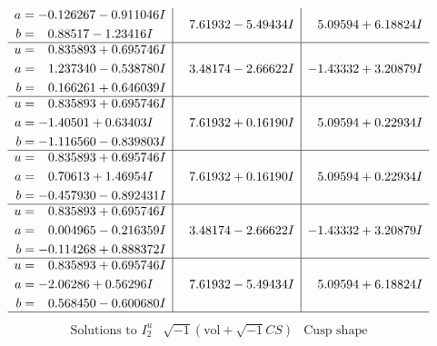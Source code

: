 \documentclass[1p]{elsarticle_modified}
\theoremstyle{definition}
\newcommand{\I}{\sqrt{-1}}
\begin{document}
$$\begin{array}{c|c|c}
\begin{aligned}
a &= -0.126267 - 0.911046 I \\
b &= \phantom{-}0.88517 - 1.23416 I\end{aligned}
 & \phantom{-}7.61932 - 5.49434 I & \phantom{-}5.09594 + 6.18824 I \\ \hline\begin{aligned}
u &= \phantom{-}0.835893 + 0.695746 I \\
a &= \phantom{-}1.237340 - 0.538780 I \\
b &= \phantom{-}0.166261 + 0.646039 I\end{aligned}
 & \phantom{-}3.48174 - 2.66622 I & -1.43332 + 3.20879 I \\ \hline\begin{aligned}
u &= \phantom{-}0.835893 + 0.695746 I \\
a &= -1.40501 + 0.63403 I \\
b &= -1.116560 - 0.839803 I\end{aligned}
 & \phantom{-}7.61932 + 0.16190 I & \phantom{-}5.09594 + 0.22934 I \\ \hline\begin{aligned}
u &= \phantom{-}0.835893 + 0.695746 I \\
a &= \phantom{-}0.70613 + 1.46954 I \\
b &= -0.457930 - 0.892431 I\end{aligned}
 & \phantom{-}7.61932 + 0.16190 I & \phantom{-}5.09594 + 0.22934 I \\ \hline\begin{aligned}
u &= \phantom{-}0.835893 + 0.695746 I \\
a &= \phantom{-}0.004965 - 0.216359 I \\
b &= -0.114268 + 0.888372 I\end{aligned}
 & \phantom{-}3.48174 - 2.66622 I & -1.43332 + 3.20879 I \\ \hline\begin{aligned}
u &= \phantom{-}0.835893 + 0.695746 I \\
a &= -2.06286 + 0.56296 I \\
b &= \phantom{-}0.568450 - 0.600680 I\end{aligned}
 & \phantom{-}7.61932 - 5.49434 I & \phantom{-}5.09594 + 6.18824 I\\
 \hline 
 \end{array}$$\newpage$$\begin{array}{c|c|c}  
\text{Solutions to }I^u_{2}& \I (\text{vol} + \sqrt{-1}CS) & \text{Cusp shape}\\
 \hline 
\begin{aligned}

\end{aligned}
\end{array}$$
\end{document}
